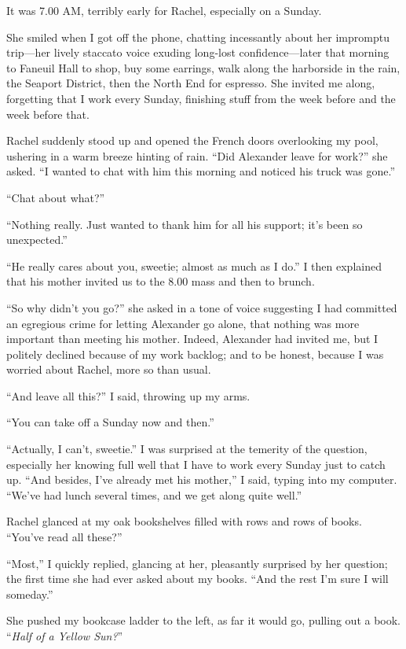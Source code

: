 It was 7.00 AM, terribly early for Rachel, especially on a Sunday.

She smiled when I got off the phone, chatting incessantly about her
impromptu trip---her lively staccato voice exuding long-lost
confidence---later that morning to Faneuil Hall to shop, buy some
earrings, walk along the harborside in the rain, the Seaport District,
then the North End for espresso. She invited me along, forgetting that I
work every Sunday, finishing stuff from the week before and the week
before that.

Rachel suddenly stood up and opened the French doors overlooking my
pool, ushering in a warm breeze hinting of rain. ``Did Alexander leave
for work?'' she asked. ``I wanted to chat with him this morning and
noticed his truck was gone.''

``Chat about what?''

``Nothing really. Just wanted to thank him for all his support; it's
been so unexpected.''

``He really cares about you, sweetie; almost as much as I do.'' I then
explained that his mother invited us to the 8.00 mass and then to
brunch.

``So why didn't you go?'' she asked in a tone of voice suggesting I had
committed an egregious crime for letting Alexander go alone, that
nothing was more important than meeting his mother. Indeed, Alexander
had invited me, but I politely declined because of my work backlog; and
to be honest, because I was worried about Rachel, more so than usual.

``And leave all this?'' I said, throwing up my arms.

``You can take off a Sunday now and then.''

``Actually, I can't, sweetie.'' I was surprised at the temerity of the
question, especially her knowing full well that I have to work every
Sunday just to catch up. ``And besides, I've already met his mother,'' I
said, typing into my computer. ``We've had lunch several times, and we
get along quite well.''

Rachel glanced at my oak bookshelves filled with rows and rows of books.
``You've read all these?''

``Most,'' I quickly replied, glancing at her, pleasantly surprised by
her question; the first time she had ever asked about my books. ``And
the rest I'm sure I will someday.''

She pushed my bookcase ladder to the left, as far it would go, pulling
out a book. ``\emph{Half of a Yellow Sun?}''

